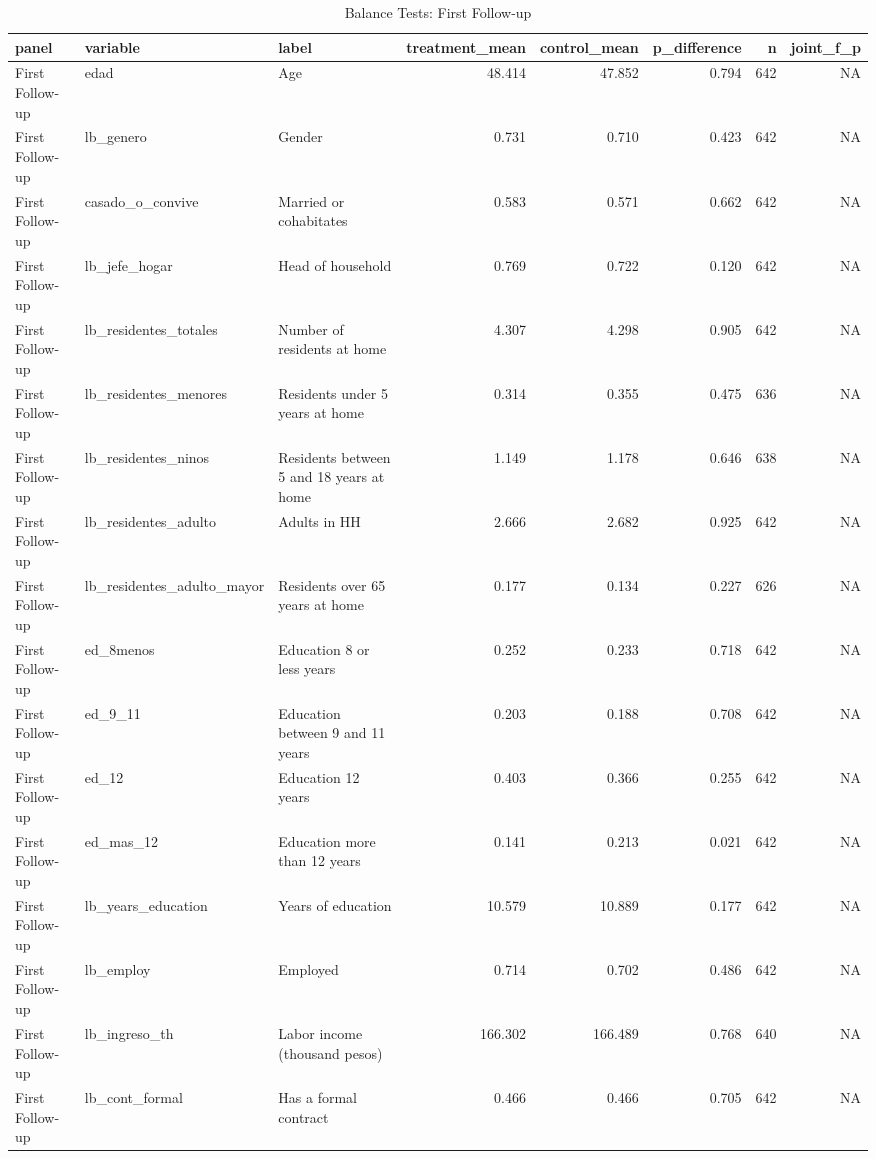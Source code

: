 \begin{table}

\caption{Balance Tests: First Follow-up}
\centering
\begin{tabular}[t]{lllrrrrr}
\toprule
panel & variable & label & treatment\_mean & control\_mean & p\_difference & n & joint\_f\_p\\
\midrule
First Follow-up & edad & Age & 48.414 & 47.852 & 0.794 & 642 & NA\\
First Follow-up & lb\_genero & Gender & 0.731 & 0.710 & 0.423 & 642 & NA\\
First Follow-up & casado\_o\_convive & Married or cohabitates & 0.583 & 0.571 & 0.662 & 642 & NA\\
First Follow-up & lb\_jefe\_hogar & Head of household & 0.769 & 0.722 & 0.120 & 642 & NA\\
First Follow-up & lb\_residentes\_totales & Number of residents at home & 4.307 & 4.298 & 0.905 & 642 & NA\\
\addlinespace
First Follow-up & lb\_residentes\_menores & Residents under 5 years at home & 0.314 & 0.355 & 0.475 & 636 & NA\\
First Follow-up & lb\_residentes\_ninos & Residents between 5 and 18 years at home & 1.149 & 1.178 & 0.646 & 638 & NA\\
First Follow-up & lb\_residentes\_adulto & Adults in HH & 2.666 & 2.682 & 0.925 & 642 & NA\\
First Follow-up & lb\_residentes\_adulto\_mayor & Residents over 65 years at home & 0.177 & 0.134 & 0.227 & 626 & NA\\
First Follow-up & ed\_8menos & Education 8 or less years & 0.252 & 0.233 & 0.718 & 642 & NA\\
\addlinespace
First Follow-up & ed\_9\_11 & Education between 9 and 11 years & 0.203 & 0.188 & 0.708 & 642 & NA\\
First Follow-up & ed\_12 & Education 12 years & 0.403 & 0.366 & 0.255 & 642 & NA\\
First Follow-up & ed\_mas\_12 & Education more than 12 years & 0.141 & 0.213 & 0.021 & 642 & NA\\
First Follow-up & lb\_years\_education & Years of education & 10.579 & 10.889 & 0.177 & 642 & NA\\
First Follow-up & lb\_employ & Employed & 0.714 & 0.702 & 0.486 & 642 & NA\\
\addlinespace
First Follow-up & lb\_ingreso\_th & Labor income (thousand pesos) & 166.302 & 166.489 & 0.768 & 640 & NA\\
First Follow-up & lb\_cont\_formal & Has a formal contract & 0.466 & 0.466 & 0.705 & 642 & NA\\

\end{tabular}
\end{table}
